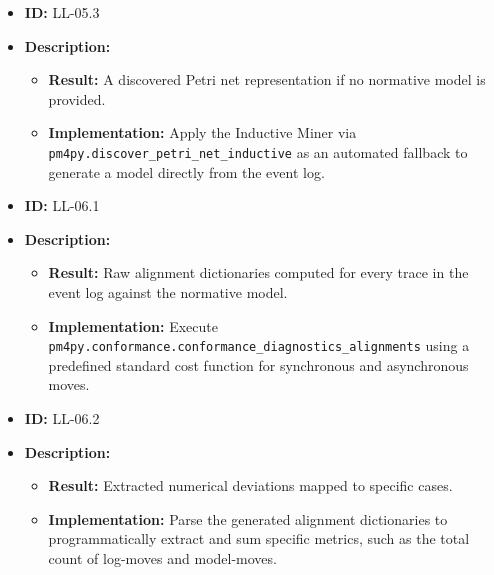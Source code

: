 \documentclass[12pt,a4paper]{article}
\begin{document}
\begin{itemize}
    \item \textbf{ID:} LL-05.3
    \item \textbf{Description:}
    \begin{itemize}
        \item \textbf{Result:} A discovered Petri net representation if no normative model is provided.
        \item \textbf{Implementation:} Apply the Inductive Miner via \\ \texttt{pm4py.discover\_petri\_net\_inductive} as an automated fallback to generate a model directly from the event log.
    \end{itemize}
\end{itemize}
\vspace{1.5em}

\begin{itemize}
    \item \textbf{ID:} LL-06.1
    \item \textbf{Description:}
    \begin{itemize}
        \item \textbf{Result:} Raw alignment dictionaries computed for every trace in the event log against the normative model.
        \item \textbf{Implementation:} Execute \\ \texttt{pm4py.conformance.conformance\_diagnostics\_alignments} using a predefined standard cost function for synchronous and asynchronous moves.
    \end{itemize}
\end{itemize}
\vspace{1.5em}

\begin{itemize}
    \item \textbf{ID:} LL-06.2
    \item \textbf{Description:}
    \begin{itemize}
        \item \textbf{Result:} Extracted numerical deviations mapped to specific cases.
        \item \textbf{Implementation:} Parse the generated alignment dictionaries to programmatically extract and sum specific metrics, such as the total count of log-moves and model-moves.
    \end{itemize}
\end{itemize}
\vspace{1.5em}
\end{document}
